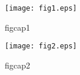 \begin{figure}[ht]
\begin{minipage}[t]{0.5\columnwidth}
\begin{center}
\texttt{[image: fig1.eps]}
\end{center}
\caption{figcap1}
\label{figlab1}
\end{minipage}
\begin{minipage}[t]{0.5\columnwidth}
\begin{center}
\texttt{[image: fig2.eps]}
\end{center}
\caption{figcap2}
\label{figlab2}
\end{minipage}
\end{figure}
